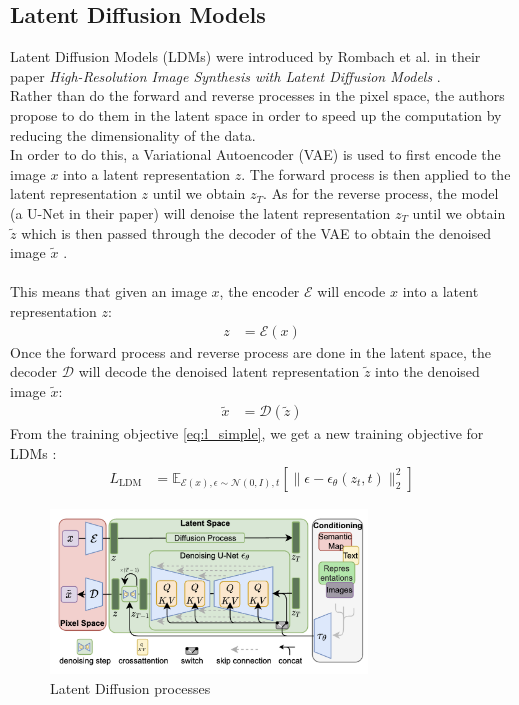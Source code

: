 \documentclass[twoside]{article}
\numberwithin{equation}{section}
\numberwithin{figure}{section}
\begin{document}
\subsection{Latent Diffusion Models}
Latent Diffusion Models (LDMs) were introduced by Rombach et al. in their paper \textit{High-Resolution Image Synthesis with Latent Diffusion Models} \cite{rombach2022highresolution}. \\
Rather than do the forward and reverse processes in the pixel space, the authors propose to do them in the latent space in order to speed up the computation by reducing the dimensionality of the data. \cite{rombach2022highresolution} \\
In order to do this, a Variational Autoencoder (VAE) is used to first encode the image $x$ into a latent representation $z$. The forward process is then applied to the latent representation $z$ until we obtain $z_T$. \cite{rombach2022highresolution}
As for the reverse process, the model (a U-Net in their paper) will denoise the latent representation $z_T$ until we obtain $\tilde{z}$ which is then passed through the decoder of the VAE to obtain the denoised image $\tilde{x}$ \cite{rombach2022highresolution}. \\
\\
This means that given an image $x$, the encoder $\mathcal{E}$ will encode $x$ into a latent representation $z$:
\begin{align}
  z &= \mathcal{E}(x)
\end{align}
Once the forward process and reverse process are done in the latent space, the decoder $\mathcal{D}$ will decode the denoised latent representation $\tilde{z}$ into the denoised image $\tilde{x}$:
\begin{align}
  \tilde{x} &= \mathcal{D}(\tilde{z})
\end{align}
From the training objective \ref{eq:l_simple}, we get a new training objective for LDMs \cite{rombach2022highresolution}:
\begin{align}
  L_{\text{LDM}} &= \mathbb{E}_{\mathcal{E}(x), \epsilon \sim \mathcal{N}(0, I), t} \left[ \| \epsilon - \epsilon_\theta (z_t, t) \|_2^2 \right]
\end{align}
\begin{figure}[h]
  \begin{center}
    \includegraphics[width=0.75\textwidth]{images/latentdiffusion.png}
    \caption{Latent Diffusion processes \cite{rombach2022highresolution}}
  \end{center}
\end{figure}
\end{document}
